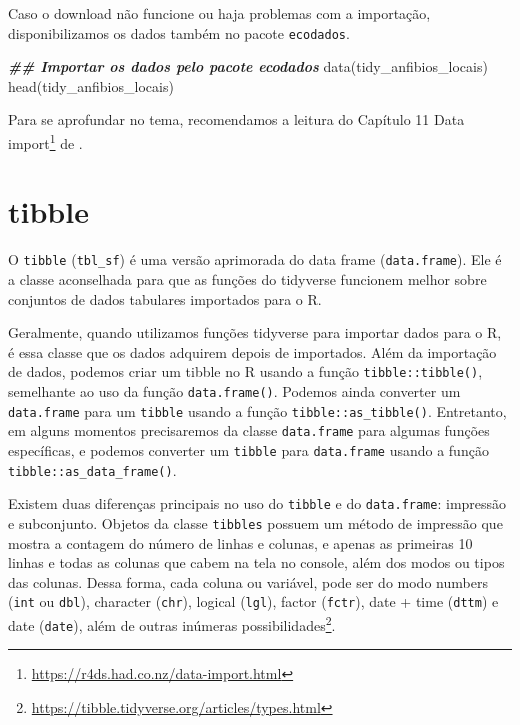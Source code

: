 \documentclass[
]{book}
\newenvironment{Shaded}{\begin{snugshade}}{\end{snugshade}}
\newcommand{\DocumentationTok}[1]{\textcolor[rgb]{0.37,0.37,0.37}{\textbf{\textit{#1}}}}
\newcommand{\FunctionTok}[1]{\textcolor[rgb]{0,0,0}{#1}}
\newcommand{\NormalTok}[1]{#1}
\renewcommand{\href}[2]{#2\footnote{\url{#1}}}
\begin{document}
Caso o download não funcione ou haja problemas com a importação, disponibilizamos os dados também no pacote \texttt{ecodados}.

\begin{Shaded}
\begin{Highlighting}[]
\DocumentationTok{\#\# Importar os dados pelo pacote ecodados}
\FunctionTok{data}\NormalTok{(tidy\_anfibios\_locais)}
\FunctionTok{head}\NormalTok{(tidy\_anfibios\_locais)}
\end{Highlighting}
\end{Shaded}

Para se aprofundar no tema, recomendamos a leitura do Capítulo \href{https://r4ds.had.co.nz/data-import.html}{11 Data import} de \citet{wickham2017}.

\hypertarget{tibble}{%
\section{tibble}\label{tibble}}

O \texttt{tibble} (\texttt{tbl\_sf}) é uma versão aprimorada do data frame (\texttt{data.frame}). Ele é a classe aconselhada para que as funções do tidyverse funcionem melhor sobre conjuntos de dados tabulares importados para o R.

Geralmente, quando utilizamos funções tidyverse para importar dados para o R, é essa classe que os dados adquirem depois de importados. Além da importação de dados, podemos criar um tibble no R usando a função \texttt{tibble::tibble()}, semelhante ao uso da função \texttt{data.frame()}. Podemos ainda converter um \texttt{data.frame} para um \texttt{tibble} usando a função \texttt{tibble::as\_tibble()}. Entretanto, em alguns momentos precisaremos da classe \texttt{data.frame} para algumas funções específicas, e podemos converter um \texttt{tibble} para \texttt{data.frame} usando a função \texttt{tibble::as\_data\_frame()}.

Existem duas diferenças principais no uso do \texttt{tibble} e do \texttt{data.frame}: impressão e subconjunto. Objetos da classe \texttt{tibbles} possuem um método de impressão que mostra a contagem do número de linhas e colunas, e apenas as primeiras 10 linhas e todas as colunas que cabem na tela no console, além dos modos ou tipos das colunas. Dessa forma, cada coluna ou variável, pode ser do modo numbers (\texttt{int} ou \texttt{dbl}), character (\texttt{chr}), logical (\texttt{lgl}), factor (\texttt{fctr}), date + time (\texttt{dttm}) e date (\texttt{date}), além de outras \href{https://tibble.tidyverse.org/articles/types.html}{inúmeras possibilidades}.
\end{document}

